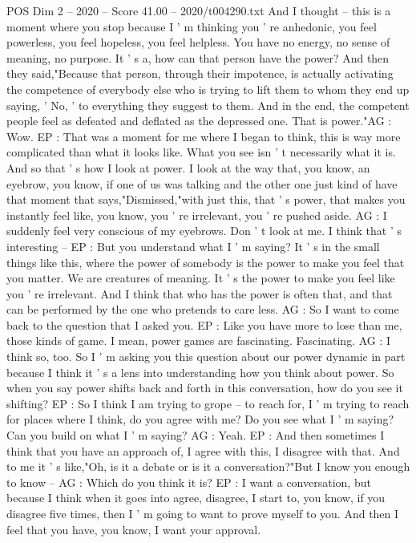 \begin{textsample}{POS Dim 2 – 2020 – Score 41.00 – 2020/t004290.txt}
And I thought -- this is a moment where you stop because I ' m thinking you ' re anhedonic, you feel powerless, you feel hopeless, you feel helpless.
You have no energy, no sense of meaning, no purpose.
It ' s a, how can that person have the power?
And then they said,"Because that person, through their impotence, is actually activating the competence of everybody else who is trying to lift them to whom they end up saying, ' No, ' to everything they suggest to them.
And in the end, the competent people feel as defeated and deflated as the depressed one.
That is power."AG : Wow.
EP : That was a moment for me where I began to think, this is way more complicated than what it looks like.
What you see isn ' t necessarily what it is.
And so that ' s how I look at power.
I look at the way that, you know, an eyebrow, you know, if one of us was talking and the other one just kind of have that moment that says,"Dismissed,"with just this, that ' s power, that makes you instantly feel like, you know, you ' re irrelevant, you ' re pushed aside.
AG : I suddenly feel very conscious of my eyebrows.
Don ' t look at me.
I think that ' s interesting -- EP : But you understand what I ' m saying?
It ' s in the small things like this, where the power of somebody is the power to make you feel that you matter.
We are creatures of meaning.
It ' s the power to make you feel like you ' re irrelevant.
And I think that who has the power is often that, and that can be performed by the one who pretends to care less.
AG : So I want to come back to the question that I asked you.
EP : Like you have more to lose than me, those kinds of game.
I mean, power games are fascinating.
Fascinating.
AG : I think so, too.
So I ' m asking you this question about our power dynamic in part because I think it ' s a lens into understanding how you think about power.
So when you say power shifts back and forth in this conversation, how do you see it shifting?
EP : So I think I am trying to grope -- to reach for, I ' m trying to reach for places where I think, do you agree with me?
Do you see what I ' m saying?
Can you build on what I ' m saying?
AG : Yeah.
EP : And then sometimes I think that you have an approach of, I agree with this, I disagree with that.
And to me it ' s like,"Oh, is it a debate or is it a conversation?"But I know you enough to know -- AG : Which do you think it is?
EP : I want a conversation, but because I think when it goes into agree, disagree, I start to, you know, if you disagree five times, then I ' m going to want to prove myself to you.
And then I feel that you have, you know, I want your approval.

\end{textsample}
